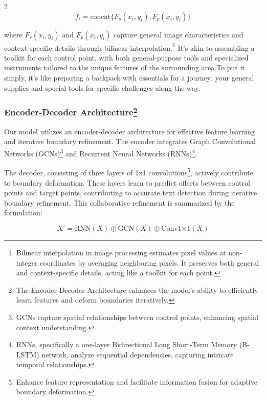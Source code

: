 \documentclass[sn-mathphys,Numbered]{sn-jnl}%
\begin{document}
\begin{multicols}{2}
\begin{equation}
	f_i = \text{concat}\{F_s(x_i, y_i), F_p(x_i, y_i)\}
\end{equation}

where $F_s(x_i, y_i)$ and $F_p(x_i, y_i)$ capture general image characteristics and context-specific details through bilinear interpolation.\protect\footnote{Bilinear interpolation in image processing estimates pixel values at non-integer coordinates by averaging neighboring pixels. It preserves both general and context-specific details, acting like a toolkit for each point.} It's akin to assembling a toolkit for each control point, with both general-purpose tools and specialized instruments tailored to the unique features of the surrounding area.To put it simply, it's like preparing a backpack with essentials for a journey: your general supplies and special tools for specific challenges along the way.

\subsubsection*{Encoder-Decoder Architecture\protect\footnote{The Encoder-Decoder Architecture enhances the model's ability to efficiently learn features and deform boundaries iteratively.}}

Our model utilizes an encoder-decoder architecture for effective feature learning and iterative boundary refinement. The encoder integrates Graph Convolutional Networks (GCNs)\protect\footnote{GCNs capture spatial relationships between control points, enhancing spatial context understanding.} and Recurrent Neural Networks (RNNs)\protect\footnote{RNNs, specifically a one-layer Bidirectional Long Short-Term Memory (B-LSTM) network, analyze sequential dependencies, capturing intricate temporal relationships.}.

The decoder, consisting of three layers of 1x1 convolutions\protect\footnote{Enhance feature representation and facilitate information fusion for adaptive boundary deformation.}, actively contribute to boundary deformation. These layers learn to predict offsets between control points and target points, contributing to accurate text detection during iterative boundary refinement. This collaborative refinement is summarized by the formulation:

\begin{equation}
	X' = \text{{RNN}}(X) \oplus \text{{GCN}}(X) \oplus \text{{Conv1×1}}(X)
\end{equation}


\end{multicols}
\end{document}
